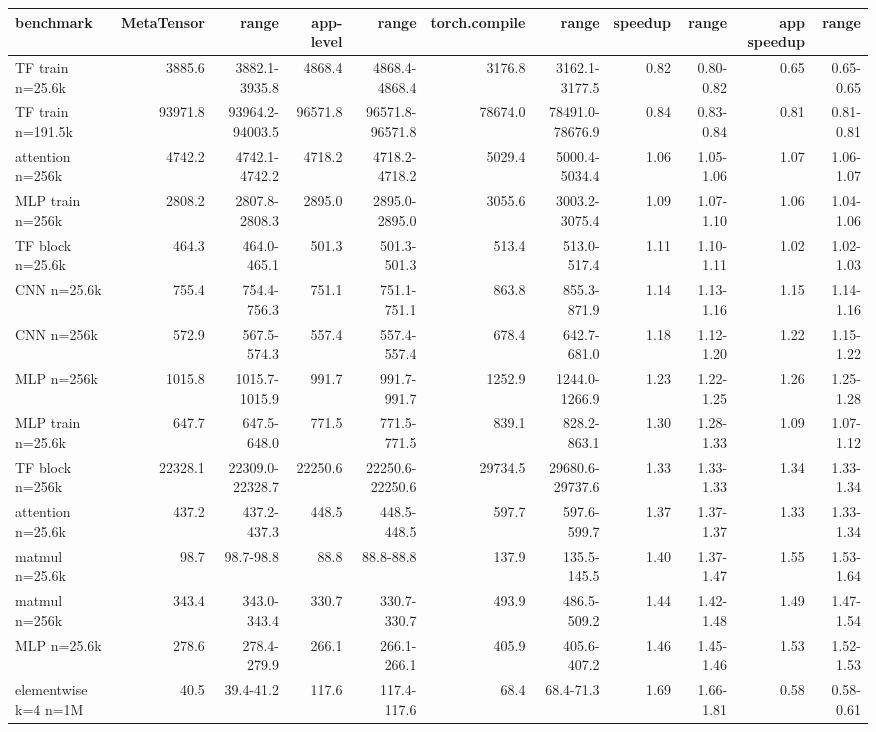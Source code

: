 \begin{tabular}{lrrrrrrrrrr}
\toprule
benchmark & MetaTensor & range & app-level & range & torch.compile & range & speedup & range & app speedup & range \\
\midrule
TF train n=25.6k & 3885.6 & 3882.1-3935.8 & 4868.4 & 4868.4-4868.4 & 3176.8 & 3162.1-3177.5 & 0.82 & 0.80-0.82 & 0.65 & 0.65-0.65 \\
TF train n=191.5k & 93971.8 & 93964.2-94003.5 & 96571.8 & 96571.8-96571.8 & 78674.0 & 78491.0-78676.9 & 0.84 & 0.83-0.84 & 0.81 & 0.81-0.81 \\
attention n=256k & 4742.2 & 4742.1-4742.2 & 4718.2 & 4718.2-4718.2 & 5029.4 & 5000.4-5034.4 & 1.06 & 1.05-1.06 & 1.07 & 1.06-1.07 \\
MLP train n=256k & 2808.2 & 2807.8-2808.3 & 2895.0 & 2895.0-2895.0 & 3055.6 & 3003.2-3075.4 & 1.09 & 1.07-1.10 & 1.06 & 1.04-1.06 \\
TF block n=25.6k & 464.3 & 464.0-465.1 & 501.3 & 501.3-501.3 & 513.4 & 513.0-517.4 & 1.11 & 1.10-1.11 & 1.02 & 1.02-1.03 \\
CNN n=25.6k & 755.4 & 754.4-756.3 & 751.1 & 751.1-751.1 & 863.8 & 855.3-871.9 & 1.14 & 1.13-1.16 & 1.15 & 1.14-1.16 \\
CNN n=256k & 572.9 & 567.5-574.3 & 557.4 & 557.4-557.4 & 678.4 & 642.7-681.0 & 1.18 & 1.12-1.20 & 1.22 & 1.15-1.22 \\
MLP n=256k & 1015.8 & 1015.7-1015.9 & 991.7 & 991.7-991.7 & 1252.9 & 1244.0-1266.9 & 1.23 & 1.22-1.25 & 1.26 & 1.25-1.28 \\
MLP train n=25.6k & 647.7 & 647.5-648.0 & 771.5 & 771.5-771.5 & 839.1 & 828.2-863.1 & 1.30 & 1.28-1.33 & 1.09 & 1.07-1.12 \\
TF block n=256k & 22328.1 & 22309.0-22328.7 & 22250.6 & 22250.6-22250.6 & 29734.5 & 29680.6-29737.6 & 1.33 & 1.33-1.33 & 1.34 & 1.33-1.34 \\
attention n=25.6k & 437.2 & 437.2-437.3 & 448.5 & 448.5-448.5 & 597.7 & 597.6-599.7 & 1.37 & 1.37-1.37 & 1.33 & 1.33-1.34 \\
matmul n=25.6k & 98.7 & 98.7-98.8 & 88.8 & 88.8-88.8 & 137.9 & 135.5-145.5 & 1.40 & 1.37-1.47 & 1.55 & 1.53-1.64 \\
matmul n=256k & 343.4 & 343.0-343.4 & 330.7 & 330.7-330.7 & 493.9 & 486.5-509.2 & 1.44 & 1.42-1.48 & 1.49 & 1.47-1.54 \\
MLP n=25.6k & 278.6 & 278.4-279.9 & 266.1 & 266.1-266.1 & 405.9 & 405.6-407.2 & 1.46 & 1.45-1.46 & 1.53 & 1.52-1.53 \\
elementwise k=4 n=1M & 40.5 & 39.4-41.2 & 117.6 & 117.4-117.6 & 68.4 & 68.4-71.3 & 1.69 & 1.66-1.81 & 0.58 & 0.58-0.61 \\

\end{tabular}
